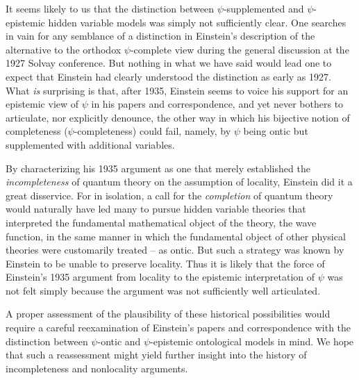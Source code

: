 \documentclass[aps,nofootinbib,12pt]{revtex4}
\begin{document}
It seems likely to us that the distinction between
$\psi$-supplemented and $\psi$-epistemic hidden variable models was
simply not sufficiently clear. One searches in vain for any
semblance of a distinction in Einstein's description of the
alternative to the orthodox $\psi$-complete view during the general
discussion at the 1927 Solvay conference. But nothing in what we
have said would lead one to expect that Einstein had clearly
understood the distinction as early as 1927. What \textit{is}
surprising is that, after 1935, Einstein seems to voice his support
for an epistemic view of $\psi$ in his papers and correspondence,
and yet never bothers to articulate, nor explicitly denounce, the
other way in which his bijective notion of completeness
($\psi$-completeness) could fail, namely, by $\psi$ being ontic but
supplemented with additional variables.

By characterizing his 1935 argument as one that merely established
the \textit{incompleteness} of quantum theory on the assumption of
locality, Einstein did it a great disservice. For in isolation, a
call for the \textit{completion} of quantum theory would naturally
have led many to pursue hidden variable theories that interpreted
the fundamental mathematical object of the theory, the wave
function, in the same manner in which the fundamental object of
other physical theories were customarily treated -- as ontic. But
such a strategy was known by Einstein to be unable to preserve
locality.
Thus it is likely that the force of Einstein's 1935 argument from
locality to the epistemic interpretation of $\psi$ was not felt
simply because the argument was not sufficiently well articulated.

A proper assessment of the plausibility of these historical
possibilities would require a careful reexamination of Einstein's
papers and correspondence with the distinction between $\psi$-ontic
and $\psi$-epistemic ontological models in mind. We hope that such a
reassessment might yield further insight into the history of
incompleteness and nonlocality arguments.
\end{document}
